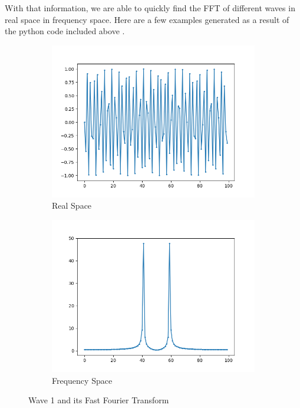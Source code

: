 \documentclass{amsproc}
\begin{document}
With that information, we are able to quickly find the FFT of different waves in real space in frequency space. Here are a few examples generated as a result of the python code included above \cite{Intuition}. 

\begin{figure}[h]
\centering
\begin{subfigure}{.4\textwidth}
	\centering
	\includegraphics[scale=.25]{images/FFTOriginal1.png}
	\caption{Real Space}
	\label{fig:sub1}
\end{subfigure} %
\begin{subfigure}{.4\textwidth}
	\centering
	\includegraphics[scale=.25]{images/FFTResult1.png}
	\caption{Frequency Space}
	\label{fig:sub2}
\end{subfigure}
\caption{Wave 1 and its Fast Fourier Transform}
\label{fig:text1}
\end{figure}
\end{document}
